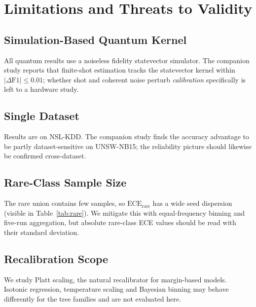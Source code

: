 \documentclass[journal]{IEEEtran}
\newcommand{\ECE}{\mathrm{ECE}}
\begin{document}
\section{Limitations and Threats to Validity}\label{sec:limits}

\subsection{Simulation-Based Quantum Kernel}
All quantum results use a noiseless fidelity statevector simulator. The
companion study reports that finite-shot estimation tracks the
statevector kernel within $|\Delta\mathrm{F1}|\le0.01$; whether shot and
coherent noise perturb \emph{calibration} specifically is left to a
hardware study.

\subsection{Single Dataset}
Results are on NSL-KDD. The companion study finds the accuracy advantage
to be partly dataset-sensitive on UNSW-NB15; the reliability picture
should likewise be confirmed cross-dataset.

\subsection{Rare-Class Sample Size}
The rare union contains few samples, so $\ECE_{\text{rare}}$ has a wide
seed dispersion (visible in Table~\ref{tab:rare}). We mitigate this with
equal-frequency binning and five-run aggregation, but absolute
rare-class ECE values should be read with their standard deviation.

\subsection{Recalibration Scope}
We study Platt scaling, the natural recalibrator for margin-based models.
Isotonic regression, temperature scaling and Bayesian binning may behave
differently for the tree families and are not evaluated here.

\end{document}
